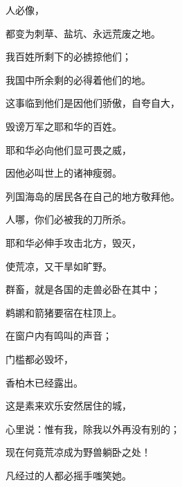 {\par }{人必像{}，
\par }{\Q 都变为刺草、盐坑、永远荒废之地。
\par }{\Q 我百姓所剩下的必掳掠他们；
\par }{\Q 我国中所余剩的必得着他们的地。
\par }{\BB \par }{\Q {}这事临到他们是因他们骄傲，自夸自大，
\par }{\Q 毁谤万军之耶和华的百姓。
\par }{\Q {}耶和华必向他们显可畏之威，
\par }{\Q 因他必叫世上的诸神瘦弱。
\par }{\Q 列国海岛的居民各在自己的地方敬拜他。
\par }{\BB \par }{\Q {}人哪，你们必被我的刀所杀。
\par }{\BB \par }{\Q {}耶和华必伸手攻击北方，毁灭{}，
\par }{\Q 使{}荒凉，又干旱如旷野。
\par }{\Q {}群畜，就是各国的走兽必卧在其中；
\par }{\Q 鹈鹕和箭猪要宿在柱顶上。
\par }{\Q 在窗户内有鸣叫的声音；
\par }{\Q 门槛都必毁坏，
\par }{\Q 香柏木已经露出。
\par }{\Q {}这是素来欢乐安然居住的城，
\par }{\Q 心里说：惟有我，除我以外再没有别的；
\par }{\Q 现在何竟荒凉成为野兽躺卧之处！
\par }{\Q 凡经过的人都必摇手嗤笑她。

}
